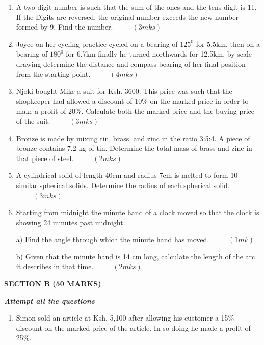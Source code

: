 \documentclass[
  a4paperpaper,
]{scrbook}
\begin{document}
\begin{tcolorbox}
\begin{enumerate}
\def\labelenumi{\arabic{enumi}.}
\setcounter{enumi}{10}
\item
  A two digit number is such that the sum of the ones and the tens digit
  is 11. If the Digits are reversed; the original number exceeds the new
  number formed by 9. Find the number. \(\hspace{1cm} (3mks)\)
\item
  Joyce on her cycling practice cycled on a bearing of \(125^0\) for
  5.5km, then on a bearing of \(180^0\) for 6.7km finally he turned
  northwards for 12.5km, by scale drawing determine the distance and
  compass bearing of her final position from the starting point.
  \(\hspace{1cm} (4mks)\)
\item
  Njoki bought Mike a suit for Ksh. 3600. This price was such that the
  shopkeeper had allowed a discount of 10\% on the marked price in order
  to make a profit of 20\%. Calculate both the marked price and the
  buying price of the suit. \(\hspace{1cm} (3mks)\)
\item
  Bronze is made by mixing tin, brass, and zinc in the ratio 3:5:4. A
  piece of bronze contains 7.2 kg of tin. Determine the total mass of
  brass and zinc in that piece of steel. \(\hspace{1cm}(2mks)\)
\item
  A cylindrical solid of length 40cm and radius 7cm is melted to form 10
  similar spherical solids. Determine the radius of each spherical
  solid. \(\hspace{1cm} (3mks)\)
\item
  Starting from midnight the minute hand of a clock moved so that the
  clock is showing 24 minutes past midnight.

  a) Find the angle through which the minute hand has moved.
  \(\hspace{1cm} (1mk)\)

  b) Given that the minute hand is 14 cm long, calculate the length of
  the arc it describes in that time. \(\hspace{1cm} (2mks)\)
\end{enumerate}

\ul{\textbf{SECTION B (50 MARKS)}}

\textbf{\emph{Attempt all the questions}}

\begin{enumerate}
\def\labelenumi{\arabic{enumi}.}
\setcounter{enumi}{16}
\item
  Simon sold an article at Ksh. 5,100 after allowing his customer a 15\%
  discount on the marked price of the article. In so doing he made a
  profit of 25\%.


\end{enumerate}
\end{tcolorbox}
\end{document}
